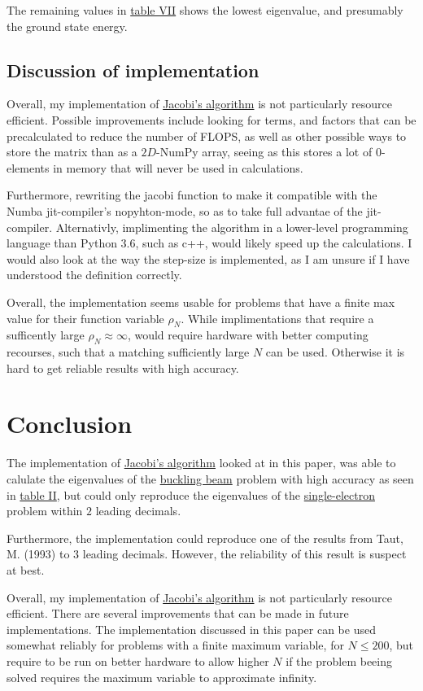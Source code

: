 \documentclass[english,notitlepage,reprint]{revtex4-1}  %
\begin{document}
The remaining values in \hyperref[tab:441]{table VII} shows the lowest eigenvalue, and presumably the ground state energy.

\subsection{Discussion of implementation}\label{subsec:45}
Overall, my implementation of \hyperref[subsec:32]{Jacobi's algorithm} is not particularly resource efficient. Possible improvements include looking for terms, and factors that can be precalculated to reduce the number of FLOPS, as well as other possible ways to store the matrix than as a \(2D\)-NumPy array, seeing as this stores a lot of \(0\)-elements in memory that will never be used in calculations.

Furthermore, rewriting the jacobi function to make it compatible with the Numba jit-compiler's nopyhton-mode, so as to take full advantae of the jit-compiler. Alternativly, implimenting the algorithm in a lower-level programming language than Python 3.6, such as c++, would likely speed up the calculations. I would also look at the way the step-size is implemented, as I am unsure if I have understood the definition correctly.

Overall, the implementation seems usable for problems that have a finite max value for their function variable \(\rho_{N}\). While implimentations that require a sufficently large \(\rho_{N}\approx\infty\), would require hardware with better computing recourses, such that a matching sufficiently large \(N\) can be used. Otherwise it is hard to get reliable results with high accuracy.

\section{Conclusion}\label{sec:5}
The implementation of \hyperref[subsec:32]{Jacobi's algorithm} looked at in this paper, was able to calulate the eigenvalues of the \hyperref[subsec:21]{buckling beam} problem with high accuracy as seen in \hyperref[tab:421]{table II}, but could only reproduce the eigenvalues of the \hyperref[subsec:23]{single-electron} problem within \(2\) leading decimals.

Furthermore, the implementation could reproduce one of the results from Taut, M. (1993)\citep{PhysRevA.48.3561} to \(3\) leading decimals. However, the reliability of this result is suspect at best.

Overall, my implementation of \hyperref[subsec:32]{Jacobi's algorithm} is not particularly resource efficient. There are several improvements that can be made in future implementations. The implementation discussed in this paper can be used somewhat reliably for problems with a finite maximum variable, for \(N \leq 200\), but require to be run on better hardware to allow higher \(N\) if the problem beeing solved requires the maximum variable to approximate infinity.
\end{document}
